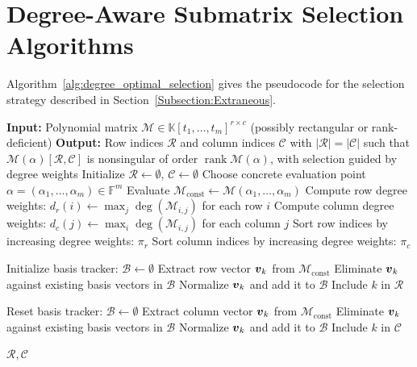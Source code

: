 \newpage
\section{Degree-Aware Submatrix Selection Algorithms}\label{appendix:algorithms}

Algorithm~\ref{alg:degree_optimal_selection} gives the pseudocode 
for the selection strategy described in Section~\ref{Subsection:Extraneous}.

\begin{algorithm}[htb!]
	\caption{Degree-aware maximal-rank submatrix selection}
	\label{alg:degree_optimal_selection}
	\begin{algorithmic}[1]
		\STATE \textbf{Input:} Polynomial matrix $\mathcal{M} \in \mathbb{K}[t_1, \ldots, t_m]^{r \times c}$ (possibly rectangular or rank-deficient)
		\STATE \textbf{Output:} Row indices $\mathcal{R}$ and column indices $\mathcal{C}$ with $|\mathcal{R}|=|\mathcal{C}|$ such that $\mathcal{M}(\alpha)[\mathcal{R}, \mathcal{C}]$ is nonsingular of order $\operatorname{rank}\mathcal{M}(\alpha)$, with selection guided by degree weights
		\STATE Initialize $\mathcal{R} \leftarrow \emptyset$, $\mathcal{C} \leftarrow \emptyset$
		\STATE Choose concrete evaluation point $\alpha = (\alpha_1, \ldots, \alpha_m) \in \mathbb{F}^m$
		\STATE Evaluate $\mathcal{M}_{\text{const}} \leftarrow \mathcal{M}(\alpha_1, \ldots, \alpha_m)$ 
		\STATE Compute row degree weights: $d_r(i) \leftarrow \max_{j} \deg(\mathcal{M}_{i,j})$ for each row $i$
		\STATE Compute column degree weights: $d_c(j) \leftarrow \max_{i} \deg(\mathcal{M}_{i,j})$ for each column $j$
		\STATE Sort row indices by increasing degree weights: $\pi_r$
		\STATE Sort column indices by increasing degree weights: $\pi_c$
		
		\STATE Initialize basis tracker: $\mathcal{B} \leftarrow \emptyset$
		\STATE Extract row vector ${\boldsymbol{v}}_k$ from $\mathcal{M}_{\text{const}}$
		\STATE Eliminate ${\boldsymbol{v}}_k$ against existing basis vectors in $\mathcal{B}$
		\STATE Normalize ${\boldsymbol{v}}_k$ and add it to $\mathcal{B}$
		\STATE Include $k$ in $\mathcal{R}$
		\ENDIF
		\ENDFOR
		
		\STATE Reset basis tracker: $\mathcal{B} \leftarrow \emptyset$
		\STATE Extract column vector ${\boldsymbol{v}}_k$ from $\mathcal{M}_{\text{const}}$
		\STATE Eliminate ${\boldsymbol{v}}_k$ against existing basis vectors in $\mathcal{B}$
		\STATE Normalize ${\boldsymbol{v}}_k$ and add it to $\mathcal{B}$
		\STATE Include $k$ in $\mathcal{C}$
		\ENDIF
		\ENDFOR
		
		\RETURN $\mathcal{R}, \mathcal{C}$
	\end{algorithmic}
\end{algorithm}

